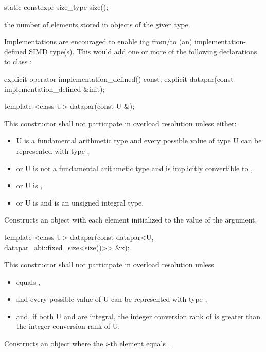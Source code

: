 \begin{itemdecl}
static constexpr size_type size();
\end{itemdecl}
\begin{itemdescr}
  \pnum\returns the number of elements stored in objects of the given \datapar[<T, Abi>] type.
\end{itemdescr}

\pnum\realnote Implementations are encouraged to enable ing from/to (an) implementation-defined SIMD type(s).
This would add one or more of the following declarations to class \datapar:
\begin{itemdecl}
explicit operator implementation_defined() const;
explicit datapar(const implementation_defined &init);
\end{itemdecl}

\begin{itemdecl}
template <class U> datapar(const U &);
\end{itemdecl}
\begin{itemdescr}
  \pnum\remarks This constructor shall not participate in overload resolution unless either:
  \begin{itemize}
    \item \type U is a fundamental arithmetic type and every possible value of type \type U can be represented with type ,
    \item or \type U is not a fundamental arithmetic type and is implicitly convertible to ,
    \item or \type U is \intt,
    \item or \type U is \uint and  is an unsigned integral type.
  \end{itemize}
  \pnum\effects Constructs an object with each element initialized to the value of the argument.
\end{itemdescr}

\begin{itemdecl}
template <class U> datapar(const datapar<U, datapar_abi::fixed_size<size()>> &x);
\end{itemdecl}
\begin{itemdescr}
  \pnum\remarks This constructor shall not participate in overload resolution unless
  \begin{itemize}
    \item {} equals \fixedsizescoped{},
    \item and every possible value of \type U can be represented with type ,
    \item and, if both \type U and  are integral, the integer conversion rank \citep[(4.15)]{N4618} of  is greater than the integer conversion rank of \type U.
  \end{itemize}
  \pnum\effects Constructs an object where the $i$-th element equals  \foralli.
\end{itemdescr}

